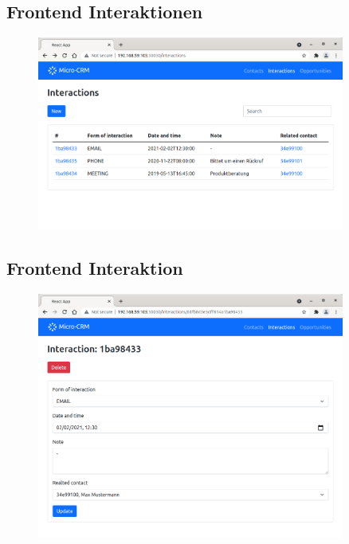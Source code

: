 \clearpage
\subsection*{Frontend Interaktionen}

\begin{figure}[H] 
    \centering
    \includegraphics[width=0.9\textwidth]{figures/FrontendInteraktionen.png}
\end{figure}

\clearpage
\subsection*{Frontend Interaktion}

\begin{figure}[H] 
    \centering
    \includegraphics[width=0.9\textwidth]{figures/FrontendInteraktion.png}
\end{figure}


